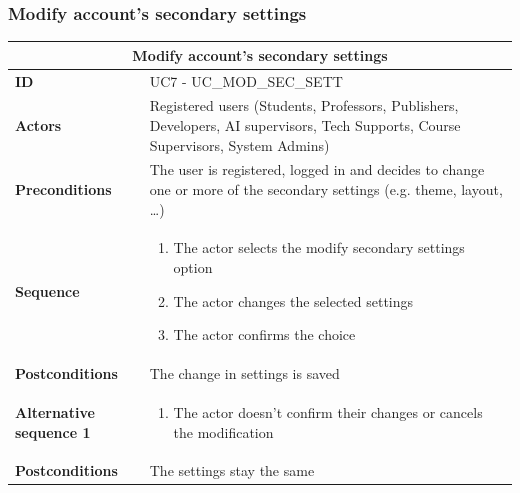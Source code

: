 \subsubsection{Modify account’s secondary settings}
\begin{tabular}{|m{2.5cm}|m{8cm}|}
	\hline
	\multicolumn{2}{|c|}{Modify account’s secondary settings} \\
	\hline
	\textbf{ID} & UC7 - UC\_MOD\_SEC\_SETT \\
	\hline
	\textbf{Actors} & Registered users (Students, Professors, Publishers, Developers, AI supervisors, Tech Supports, Course Supervisors, System Admins) \\
	\hline
	\textbf{Preconditions} & The user is registered, logged in and decides to change one or more of the secondary settings (e.g. theme, layout, …) \\
	\hline
	\textbf{Sequence} & 
	\begin{enumerate}
		\item The actor selects the modify secondary settings option
		\item The actor changes the selected settings
		\item The actor confirms the choice
	\end{enumerate} \\
	\hline
	\textbf{Postconditions} & The change in settings is saved \\
	\hline
	
	\textbf{Alternative sequence 1} & 
	\begin{enumerate}
		\item The actor doesn’t confirm their changes or cancels the modification
	\end{enumerate} \\
	\hline
	\textbf{Postconditions} & The settings stay the same \\
	\hline
\end{tabular}

